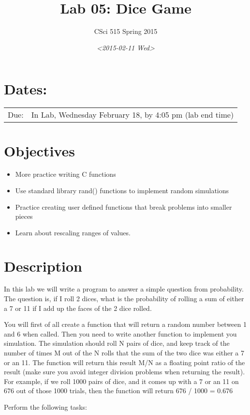 \documentclass[11pt]{article}
\author{CSci 515 Spring 2015}
\date{\textit{<2015-02-11 Wed>}}
\title{Lab 05: Dice Game}
\begin{document}
\maketitle

\section*{Dates:}
\label{sec-1}
\begin{center}
\begin{tabular}{ll}
Due: & In Lab, Wednesday February 18, by 4:05 pm (lab end time)\\
\end{tabular}
\end{center}
\section*{Objectives}
\label{sec-2}
\begin{itemize}
\item More practice writing C functions
\item Use standard library rand() functions to implement random simulations
\item Practice creating user defined functions that break problems into smaller pieces
\item Learn about rescaling ranges of values.
\end{itemize}
\section*{Description}
\label{sec-3}
In this lab we will write a program to answer a simple question from
probability.  The question is, if I roll 2 dices, what is the probability
of rolling a sum of either a 7 or 11 if I add up the faces of the 2 dice
rolled.

You will first of all create a function that will return a random
number between 1 and 6 when called.  Then you need to write another
function to implement you simulation.  The simulation should roll N
pairs of dice, and keep track of the number of times M out of the N
rolls that the sum of the two dice was either a 7 or an 11.  The
function will return this result M/N as a floating point ratio of the
result (make sure you avoid integer division problems when returning
the result).  For example, if we roll 1000 pairs of dice, and it comes
up with a 7 or an 11 on 676 out of those 1000 trials, then the
function will return 676 / 1000 = 0.676


Perform the following tasks:
\end{document}
